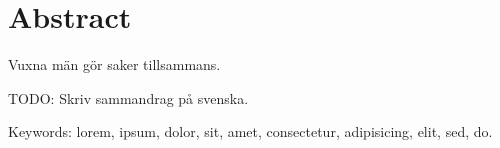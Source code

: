 
\thispagestyle{plain}			%
\section*{Abstract}
Vuxna män gör saker tillsammans.

TODO: Skriv sammandrag på svenska.

\vfill
Keywords: lorem, ipsum, dolor, sit, amet, consectetur, adipisicing, elit, sed, do.

\newpage				%
\thispagestyle{empty}
\mbox{}